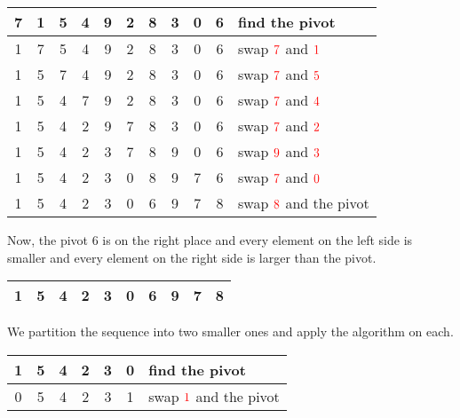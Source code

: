 \begin{center}
    \begin{tabular}{ | c | c | c | c | c | c | c | c | c | c | l | }
      \hline
      7 & 1 & 5 & 4 & 9 & 2 & 8 & 3 & 0 &\cellcolor{LightCyan}6 &find the \color{cyan}pivot\\ \hline %
      \color{red}1 & \color{red}7 & 5 & 4 & 9 & 2 & 8 & 3 & 0 &\cellcolor{LightCyan}6 &swap \(\color{red}7\) and \(\color{red}1\)\\ \hline %
      1 & \color{red}5 & \color{red}7 & 4 & 9 & 2 & 8 & 3 & 0 &\cellcolor{LightCyan}6 &swap \(\color{red}7\) and \(\color{red}5\)\\ \hline %
      1 & 5 & \color{red}4 & \color{red}7 & 9 & 2 & 8 & 3 & 0 &\cellcolor{LightCyan}6 &swap \(\color{red}7\) and \(\color{red}4\)\\ \hline %
      1 & 5 & 4 & \color{red}2 & 9 & \color{red} 7 & 8 & 3 & 0 &\cellcolor{LightCyan}6 &swap \(\color{red}7\) and \(\color{red}2\)\\ \hline %
      1 & 5 & 4 & 2 & \color{red}3 & 7 & 8 & \color{red}9 & 0 &\cellcolor{LightCyan}6 &swap \(\color{red}9\) and \(\color{red}3\)\\ \hline %
      1 & 5 & 4 & 2 & 3 & \color{red}0 & 8 & 9 & \color{red}7 &\cellcolor{LightCyan}6 &swap \(\color{red}7\) and \(\color{red}0\)\\ \hline %
      1 & 5 & 4 & 2 & 3 & 0 & \color{cyan}6 & 9 & 7 & \color{red}8 &swap \(\color{red}8\) and the {\color{cyan}pivot}\\ \hline %
    \end{tabular}
\end{center}

Now, the pivot \(6\) is on the right place and every element on the left side is smaller and every element on the right side is larger than the pivot.

\begin{center}
    \begin{tabular}{ | c | c | c | c | c | c || c || c | c | c | }
        \hline
        1 & 5 & 4 & 2 & 3 & 0 & \cellcolor{LightCyan}6 & 9 & 7 & 8 \\ \hline
    \end{tabular}
\end{center}

We partition the sequence into two smaller ones and apply the algorithm on each.

\begin{center}
    \begin{tabular}{ | c | c | c | c | c | c | l | }
        \hline
        1 & 5 & 4 & 2 & 3 & \cellcolor{LightCyan}0 & find the {\color{cyan}pivot}\\ \hline
        \color{cyan}0 & 5 & 4 & 2 & 3 & \color{red}1 & swap \(\color{red}1\) and the {\color{cyan}pivot}\\ \hline
    \end{tabular}
\end{center}

